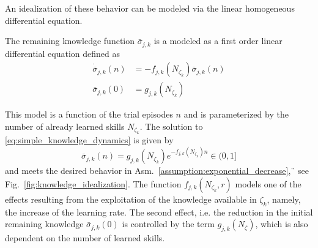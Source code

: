 An idealization of these behavior can be modeled via the linear homogeneous differential equation.
\begin{tcolorbox}
	\begin{definition}\label{assumption:ode_model}
		The remaining knowledge function $\bar{\sigma}_{j,k}$ is a modeled as a first order linear differential equation defined as
		\begin{subequations}\label{eq:simple_knowledge_dynamics}
			\begin{alignat}{2}
				\dot{\bar{\sigma}}_{j,k}\left(n\right) &= -f_{j,k} \left(N_{\zeta_k} \right) \bar{\sigma}_{j,k}\left(n\right)\\
				\bar{\sigma}_{j,k}(0) &= g_{j,k} \left(N_{\zeta_k}\right)
			\end{alignat}
		\end{subequations}
	\end{definition}
\end{tcolorbox} 
This model is a function of the trial episodes $n$ and is parameterized by the number of already learned skills $N_{\zeta_k}$. The solution to \eqref{eq:simple_knowledge_dynamics} is given by
\begin{equation}\label{eq:knowledge_exponential_form}
	\boxed{\bar{\sigma}_{j,k}(n) = g_{j,k}\left(N_{\zeta_k}\right) e ^{-f_{j,k}\left(N_{\zeta_k}\right) n} \in (0,1]}
\end{equation}
and meets the desired behavior in Asm.~\ref{assumption:exponential_decrease},¨ see Fig.~\ref{fig:knowledge_idealization}. The function $f_{j,k}\left(N_{\zeta_k}, r\right)$ models one of the effects resulting from the exploitation of the knowledge available in $\zeta_k$, namely, the increase of the learning rate. The second effect, i.e. the reduction in the initial remaining knowledge $\bar{\sigma}_{j,k}(0)$ is controlled by the term $g_{j,k}\left(N_{\zeta}\right)$, which is also dependent on the number of learned skills.
